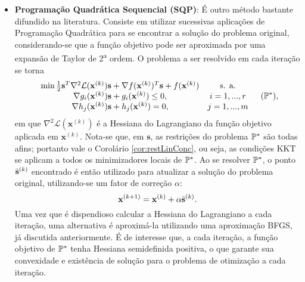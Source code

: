\begin{itemize}
\item \textbf{Programa\c{c}\~{a}o Quadr\'{a}tica Sequencial (SQP)}: \'{E} outro m\'{e}todo bastante difundido na literatura. Consiste em utilizar sucessivas aplica\c{c}\~{o}es de Programa\c{c}\~{a}o Quadr\'{a}tica para se encontrar a solu\c{c}\~{a}o do problema original, considerando-se que a fun\c{c}\~{a}o objetivo pode ser aproximada por uma expans\~{a}o de Taylor de 2\textsuperscript{a} ordem. O problema a ser resolvido em cada itera\c{c}\~{a}o se torna
\begin{equation}
\begin{array}{ccc}
\min \frac{1}{2}\mathbf{s}^{T}\nabla^2 \mathcal{L}(\mathbf{x}^{(k)})\mathbf{s} + \nabla f(\mathbf{x}^{(k)})^{T}\mathbf{s} + f(\mathbf{x}^{(k)})& \text{s. a.} &\\
\nabla g_i (\mathbf{x}^{(k)})\mathbf{s} + g_i (\mathbf{x}^{(k)})\le 0, & i = 1,...,r&\\
\nabla h_j (\mathbf{x}^{(k)})\mathbf{s} + h_j (\mathbf{x}^{(k)}) = 0, & j = 1,...,m&
\end{array} (\mathbb{P}^{*}),
\end{equation}
em que $\nabla^2 \mathcal{L}(\mathbf{x}^{(k)})$ \'{e} a Hessiana do Lagrangiano da fun\c{c}\~{a}o objetivo aplicada em $\mathbf{x}^{(k)}$. Nota-se que, em $\mathbf{s}$, as restri\c{c}\~{o}es do problema $\mathbb{P}^{*}$ s\~{a}o todas afins; portanto vale o Corol\'{a}rio \ref{cor:restLinConc}, ou seja, as condi\c{c}\~{o}es KKT se aplicam a todos os minimizadores locais de $\mathbb{P}^{*}$. Ao se resolver $\mathbb{P}^{*}$, o ponto $\bar{\mathbf{s}}^{(k)}$ encontrado \'{e} ent\~{a}o utilizado para atualizar a solu\c{c}\~{a}o do problema original, utilizando-se um fator de corre\c{c}\~{a}o $\alpha$:
\begin{equation}
\mathbf{x}^{(k+1)} = \mathbf{x}^{(k)} + \alpha \bar{\mathbf{s}}^{(k)}.
\end{equation} 
Uma vez que \'{e} dispendioso calcular a Hessiana do Lagrangiano a cada itera\c{c}\~{a}o, uma alternativa \'{e} aproxim\'{a}-la utilizando uma aproxima\c{c}\~{a}o BFGS, j\'{a} discutida anteriormente. \'{E} de interesse que, a cada itera\c{c}\~{a}o, a fun\c{c}\~{a}o objetivo de $\mathbb{P}^{*}$ tenha Hessiana semidefinida positiva, o que garante sua convexidade e exist\^{e}ncia de solu\c{c}\~{a}o para o problema de otimiza\c{c}\~{a}o a cada itera\c{c}\~{a}o.


\end{itemize}
